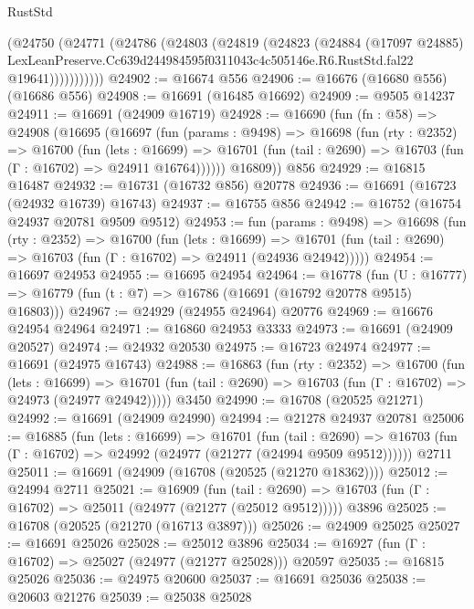 \begin{lexlean}{RustStd}
\begin{coremodule}
            (@24750
              (@24771
                (@24786
                  (@24803
                    (@24819
                      (@24823
                        (@24884
                          (@17097 @24885)
                          LexLeanPreserve.Cc639d244984595f0311043c4c505146e.R6.RustStd.fal22
                          @19641)))))))))))
@24902 := @16674 @556
@24906 := @16676 (@16680 @556) (@16686 @556)
@24908 := @16691 (@16485 @16692)
@24909 := @9505 @14237
@24911 := @16691 (@24909 @16719)
@24928 := @16690
    (fun (fn : @58) =>
    @24908
      (@16695
        (@16697
          (fun (params : @9498) =>
          @16698
            (fun (rty : @2352) =>
            @16700
              (fun (lets : @16699) =>
              @16701 (fun (tail : @2690) => @16703 (fun (Γ : @16702) => @24911 @16764))))))
        @16809))
    @856
@24929 := @16815 @16487
@24932 := @16731 (@16732 @856) @20778
@24936 := @16691 (@16723 (@24932 @16739) @16743)
@24937 := @16755 @856
@24942 := @16752 (@16754 @24937 @20781 @9509 @9512)
@24953 := fun (params : @9498) =>
  @16698
    (fun (rty : @2352) =>
    @16700
      (fun (lets : @16699) =>
      @16701 (fun (tail : @2690) => @16703 (fun (Γ : @16702) => @24911 (@24936 @24942)))))
@24954 := @16697 @24953
@24955 := @16695 @24954
@24964 := @16778
    (fun (U : @16777) => @16779 (fun (t : @7) => @16786 (@16691 (@16792 @20778 @9515) @16803)))
@24967 := @24929 (@24955 @24964) @20776
@24969 := @16676 @24954 @24964
@24971 := @16860 @24953 @3333
@24973 := @16691 (@24909 @20527)
@24974 := @24932 @20530
@24975 := @16723 @24974
@24977 := @16691 (@24975 @16743)
@24988 := @16863
    (fun (rty : @2352) =>
    @16700
      (fun (lets : @16699) =>
      @16701 (fun (tail : @2690) => @16703 (fun (Γ : @16702) => @24973 (@24977 @24942)))))
    @3450
@24990 := @16708 (@20525 @21271)
@24992 := @16691 (@24909 @24990)
@24994 := @21278 @24937 @20781
@25006 := @16885
    (fun (lets : @16699) =>
    @16701
      (fun (tail : @2690) =>
      @16703 (fun (Γ : @16702) => @24992 (@24977 (@21277 (@24994 @9509 @9512))))))
    @2711
@25011 := @16691 (@24909 (@16708 (@20525 (@21270 @18362))))
@25012 := @24994 @2711
@25021 := @16909
    (fun (tail : @2690) => @16703 (fun (Γ : @16702) => @25011 (@24977 (@21277 (@25012 @9512)))))
    @3896
@25025 := @16708 (@20525 (@21270 (@16713 @3897)))
@25026 := @24909 @25025
@25027 := @16691 @25026
@25028 := @25012 @3896
@25034 := @16927 (fun (Γ : @16702) => @25027 (@24977 (@21277 @25028))) @20597
@25035 := @16815 @25026
@25036 := @24975 @20600
@25037 := @16691 @25036
@25038 := @20603 @21276
@25039 := @25038 @25028

\end{coremodule}
\end{lexlean}

